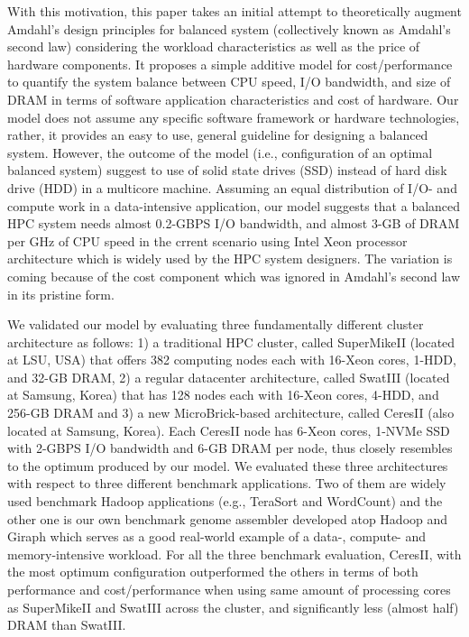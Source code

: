 \documentclass[journal]{IEEEtran}
\begin{document}
With this motivation, this paper takes an initial attempt to theoretically augment Amdahl's design principles for balanced system (collectively known as Amdahl's second law)  considering the workload characteristics as well as the price of hardware components. It proposes a simple additive model for cost/performance to quantify the system balance between CPU speed, I/O bandwidth, and size of DRAM in terms of software application characteristics and cost of hardware. Our model does not assume any specific software framework or hardware technologies, rather, it provides an easy to use, general guideline for designing a balanced system. However, the outcome of the model (i.e., configuration of an optimal balanced system) suggest to use of solid state drives (SSD) instead of hard disk drive (HDD) in a multicore machine. Assuming an equal distribution of I/O-  and compute work in a data-intensive application, our model suggests that a balanced HPC system needs almost 0.2-GBPS I/O bandwidth, and almost 3-GB of DRAM per GHz of CPU speed in the crrent scenario using Intel Xeon processor architecture which is widely used by the HPC system designers. The variation is coming because of the cost component which was ignored in Amdahl's second law in its pristine form. 


We validated our model by evaluating three fundamentally different cluster architecture as follows: 1) a traditional HPC cluster, called SuperMikeII (located at LSU, USA) that offers 382 computing nodes each with 16-Xeon cores, 1-HDD, and 32-GB DRAM, 2) a regular datacenter architecture, called SwatIII (located at Samsung, Korea) that has 128 nodes each with 16-Xeon cores, 4-HDD, and 256-GB DRAM and 3) a new MicroBrick-based architecture, called CeresII (also located at Samsung, Korea). Each CeresII node has  6-Xeon cores, 1-NVMe SSD  with 2-GBPS I/O bandwidth and 6-GB DRAM per node, thus closely resembles to the optimum produced by our model. We evaluated these three architectures with respect to three different benchmark applications. Two of them are widely  used benchmark Hadoop applications (e.g., TeraSort and WordCount) and the other one is our own benchmark genome assembler developed atop Hadoop and Giraph which serves as a good real-world example of a data-, compute- and memory-intensive workload. For all the three benchmark evaluation, CeresII, with the most optimum configuration outperformed the others in terms of both performance and cost/performance when using same amount of processing cores as SuperMikeII and SwatIII across the cluster, and significantly less (almost half) DRAM than SwatIII. 
\end{document}
